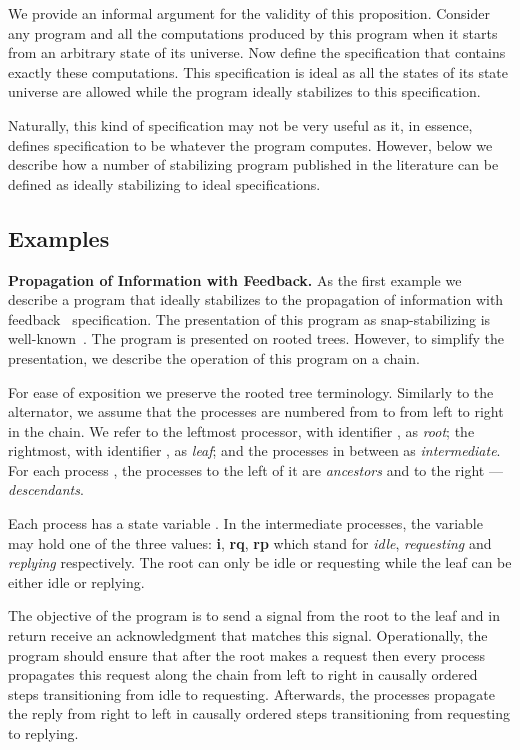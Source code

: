 \documentclass[11pt]{llncs}
\def\PROG#1{}
\begin{document}
We provide an informal argument for the validity of this
proposition. Consider any program and all the computations produced by
this program when it starts from an arbitrary state of its
universe. Now define the specification that contains exactly these
computations. This specification is ideal as all the states of its
state universe are allowed while the program ideally stabilizes to
this specification.

Naturally, this kind of specification may not be very useful as it,
in essence, defines specification to be whatever the program
computes. However, below we describe how a number of stabilizing
program published in the literature can be defined as ideally
stabilizing to ideal specifications.

\subsection{Examples}

\textbf{Propagation of Information with Feedback.} As the first
example we describe a program \PROG{PIF} that ideally stabilizes to
the propagation of information with feedback~\cite{C82,S83}
specification. The presentation of this program as snap-stabilizing is
well-known~\cite{BDPV99c}. The program is presented on rooted
trees. However, to simplify the presentation, we describe the
operation of this program on a chain.

For ease of exposition we preserve the rooted tree terminology.
Similarly to the alternator, we assume that the processes are numbered
from  to  from left to right in the chain. We refer to the
leftmost processor, with identifier , as \emph{root}; the
rightmost, with identifier , as \emph{leaf}; and the processes in
between as \emph{intermediate}. For each process , the processes to
the left of it are \emph{ancestors} and to the right ---
\emph{descendants}.

Each process has a state variable .  In the intermediate
processes, the variable may hold one of the three values: \textbf{i},
\textbf{rq}, \textbf{rp} which stand for \emph{idle},
\emph{requesting} and \emph{replying} respectively. The root can only
be idle or requesting while the leaf can be either idle or replying.

The objective of the program is to send a signal from the root to the
leaf and in return receive an acknowledgment that matches this
signal. Operationally, the program should ensure that after the root
makes a request then every process propagates this request along the
chain from left to right in causally ordered steps transitioning from
idle to requesting. Afterwards, the processes propagate the reply from
right to left in causally ordered steps transitioning from requesting
to replying.
\end{document}
